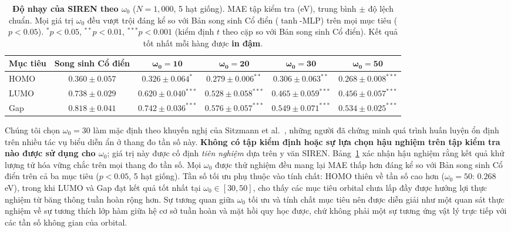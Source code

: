 \documentclass[10pt,twocolumn,letterpaper]{article}
\begin{document}
\begin{table}[t]
\centering
\small
\caption{\textbf{Độ nhạy của SIREN theo $\omega_0$} ($N = 1{,}000$, 5 hạt giống). MAE tập kiểm tra (eV), trung bình $\pm$ độ lệch chuẩn. Mọi giá trị $\omega_0$ đều vượt trội đáng kể so với Bản song sinh Cổ điển ($\tanh$-MLP) trên mọi mục tiêu ($p < 0.05$). $^{*}p < 0.05$, $^{**}p < 0.01$, $^{***}p < 0.001$ (kiểm định $t$ theo cặp so với Bản song sinh Cổ điển). Kết quả tốt nhất mỗi hàng được \textbf{in đậm}.}
\label{tab:omega_sensitivity}
\begin{tabular}{lccccc}
\toprule
\textbf{Mục tiêu} & \textbf{Song sinh Cổ điển} & $\boldsymbol{\omega_0 = 10}$ & $\boldsymbol{\omega_0 = 20}$ & $\boldsymbol{\omega_0 = 30}$ & $\boldsymbol{\omega_0 = 50}$ \\
\midrule
HOMO & $0.360 \pm 0.057$ & $0.326 \pm 0.064^{*}$ & $0.279 \pm 0.006^{**}$ & $0.306 \pm 0.063^{**}$ & $\mathbf{0.268 \pm 0.008}^{***}$ \\
LUMO & $0.738 \pm 0.029$ & $0.620 \pm 0.040^{***}$ & $0.528 \pm 0.058^{***}$ & $0.465 \pm 0.059^{***}$ & $\mathbf{0.456 \pm 0.057}^{***}$ \\
Gap  & $0.818 \pm 0.041$ & $0.742 \pm 0.036^{***}$ & $0.576 \pm 0.057^{***}$ & $0.549 \pm 0.071^{***}$ & $\mathbf{0.534 \pm 0.025}^{***}$ \\
\bottomrule
\end{tabular}
\end{table}

Chúng tôi chọn $\omega_0 = 30$ làm mặc định theo khuyến nghị của Sitzmann et al.~\cite{sitzmann2020siren}, những người đã chứng minh quá trình huấn luyện ổn định trên nhiều tác vụ biểu diễn ẩn ở thang đo tần số này. \textbf{Không có tập kiểm định hoặc sự lựa chọn hậu nghiệm trên tập kiểm tra nào được sử dụng cho $\omega_0$}; giá trị này được cố định \textit{tiên nghiệm} dựa trên y văn SIREN. Bảng~\ref{tab:omega_sensitivity} xác nhận hậu nghiệm rằng kết quả khử lượng tử hóa vững chắc trên mọi thang đo tần số. Mọi $\omega_0$ được thử nghiệm đều mang lại MAE thấp hơn đáng kể so với Bản song sinh Cổ điển trên cả ba mục tiêu ($p < 0.05$, 5 hạt giống). Tần số tối ưu phụ thuộc vào tính chất: HOMO thiên về tần số cao hơn ($\omega_0 = 50$: $0.268$\,eV), trong khi LUMO và Gap đạt kết quả tốt nhất tại $\omega_0 \in [30, 50]$, cho thấy các mục tiêu orbital chưa lấp đầy được hưởng lợi thực nghiệm từ băng thông tuần hoàn rộng hơn.
Sự tương quan giữa $\omega_0$ tối ưu và tính chất mục tiêu nên được diễn giải như một quan sát thực nghiệm về sự tương thích lớp hàm giữa hệ cơ sở tuần hoàn và mặt hồi quy học được, chứ không phải một sự tương ứng vật lý trực tiếp với các tần số không gian của orbital.
\end{document}
